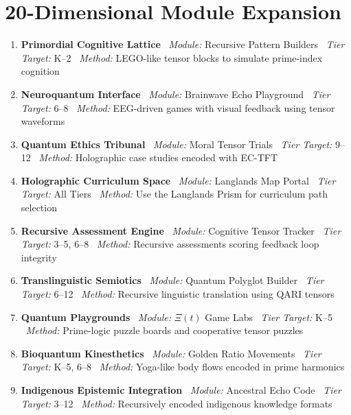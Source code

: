 \documentclass[11pt]{article}
\theoremstyle{plain}
\theoremstyle{definition}
\begin{document}
\section*{20-Dimensional Module Expansion}
\begin{enumerate}[leftmargin=*]
\item \textbf{Primordial Cognitive Lattice} \ \textit{Module:} Recursive Pattern Builders \ \textit{Tier Target:} K--2 \ \textit{Method:} LEGO-like tensor blocks to simulate prime-index cognition

\item \textbf{Neuroquantum Interface} \ \textit{Module:} Brainwave Echo Playground \ \textit{Tier Target:} 6--8 \ \textit{Method:} EEG-driven games with visual feedback using tensor waveforms

\item \textbf{Quantum Ethics Tribunal} \ \textit{Module:} Moral Tensor Trials \ \textit{Tier Target:} 9--12 \ \textit{Method:} Holographic case studies encoded with EC-TFT

\item \textbf{Holographic Curriculum Space} \ \textit{Module:} Langlands Map Portal \ \textit{Tier Target:} All Tiers \ \textit{Method:} Use the Langlands Prism for curriculum path selection

\item \textbf{Recursive Assessment Engine} \ \textit{Module:} Cognitive Tensor Tracker \ \textit{Tier Target:} 3--5, 6--8 \ \textit{Method:} Recursive assessments scoring feedback loop integrity

\item \textbf{Translinguistic Semiotics} \ \textit{Module:} Quantum Polyglot Builder \ \textit{Tier Target:} 6--12 \ \textit{Method:} Recursive linguistic translation using QARI tensors

\item \textbf{Quantum Playgrounds} \ \textit{Module:} $\Xi(t)$ Game Labs \ \textit{Tier Target:} K--5 \ \textit{Method:} Prime-logic puzzle boards and cooperative tensor puzzles

\item \textbf{Bioquantum Kinesthetics} \ \textit{Module:} Golden Ratio Movements \ \textit{Tier Target:} K--5, 6--8 \ \textit{Method:} Yoga-like body flows encoded in prime harmonics

\item \textbf{Indigenous Epistemic Integration} \ \textit{Module:} Ancestral Echo Code \ \textit{Tier Target:} 3--12 \ \textit{Method:} Recursively encoded indigenous knowledge formats


\end{enumerate}
\end{document}
